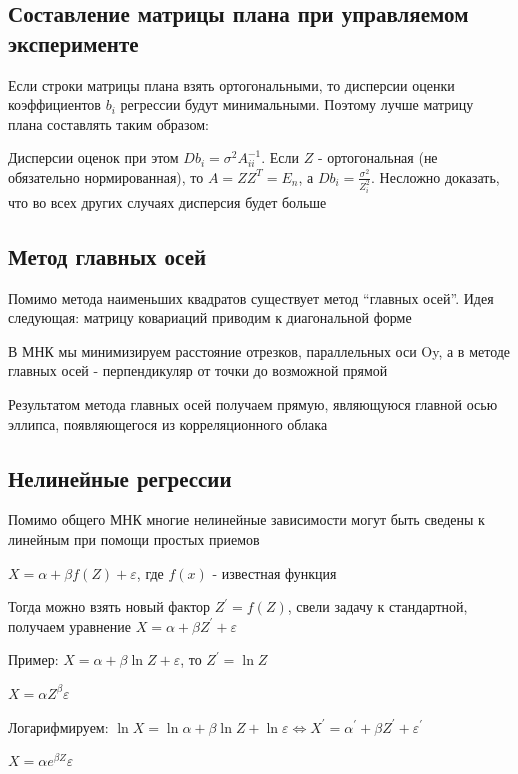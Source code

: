 \documentclass[12pt]{article}
\begin{document}
\subsection{Составление матрицы плана при управляемом эксперименте}

Если строки матрицы плана взять ортогональными, то дисперсии оценки коэффициентов $b_i$ регрессии будут минимальными. Поэтому лучше матрицу плана составлять таким образом:

Дисперсии оценок при этом $D b_i = \sigma^2 A^{-1}_{ii}$. Если $Z$ - ортогональная (не обязательно нормированная), то $A = Z Z^T = E_n$, а $D b_i = \frac{\sigma^2}{Z_i^2}$. Несложно доказать, что во всех других случаях дисперсия будет больше

\subsection{Метод главных осей}

Помимо метода наименьших квадратов существует метод \enquote{главных осей}. Идея следующая: матрицу ковариаций приводим к диагональной форме

В МНК мы минимизируем расстояние отрезков, параллельных оси Oy, а в методе главных осей - перпендикуляр от точки до возможной прямой

Результатом метода главных осей получаем прямую, являющуюся главной осью эллипса, появляющегося из корреляционного облака

\subsection{Нелинейные регрессии}

Помимо общего МНК многие нелинейные зависимости могут быть сведены к линейным при помощи простых приемов

 $X = \alpha + \beta f(Z) + \varepsilon$, где $f(x)$ - известная функция

Тогда можно взять новый фактор $Z^\prime = f(Z)$, свели задачу к стандартной, получаем уравнение $X = \alpha + \beta Z^\prime + \varepsilon$

Пример: $X = \alpha + \beta \ln Z + \varepsilon$, то $Z^\prime = \ln Z$

 $X = \alpha Z^\beta \varepsilon$

Логарифмируем: $\ln X = \ln \alpha + \beta \ln Z + \ln \varepsilon \Longleftrightarrow X^\prime = \alpha^\prime + \beta Z^\prime + \varepsilon^\prime$

 $X = \alpha e^{\beta Z} \varepsilon$
\end{document}
